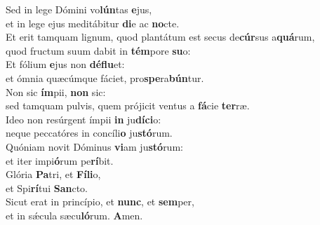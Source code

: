\evenverse Sed in lege Dómini vo\textbf{lún}tas \textbf{e}jus,~\*\\
\evenverse et in lege ejus meditábitur \textbf{di}e ac \textbf{no}cte.\\
\oddverse Et erit tamquam lignum, quod plantátum est secus de\textbf{cúr}sus a\textbf{quá}rum,~\*\\
\oddverse quod fructum suum dabit in \textbf{tém}pore \textbf{su}o:\\
\evenverse Et fólium \textbf{e}jus non \textbf{dé}\textbf{flu}et:~\*\\
\evenverse et ómnia quæcúmque fáciet, pro\textbf{spe}ra\textbf{bún}tur.\\
\oddverse Non sic \textbf{ím}pii, \textbf{non} sic:~\*\\
\oddverse sed tamquam pulvis, quem prójicit ventus a \textbf{fá}cie \textbf{ter}ræ.\\
\evenverse Ideo non resúrgent ímpii \textbf{in} ju\textbf{dí}\textbf{ci}o:~\*\\
\evenverse neque peccatóres in concíli\textbf{o} ju\textbf{stó}rum.\\
\oddverse Quóniam novit Dóminus \textbf{vi}am ju\textbf{stó}rum:~\*\\
\oddverse et iter impi\textbf{ó}rum pe\textbf{rí}bit.\\
\evenverse Glória \textbf{Pa}tri, et \textbf{Fí}\textbf{li}o,~\*\\
\evenverse et Spi\textbf{rí}tui \textbf{San}cto.\\
\oddverse Sicut erat in princípio, et \textbf{nunc}, et \textbf{sem}per,~\*\\
\oddverse et in sǽcula sæcu\textbf{ló}rum. \textbf{A}men.\\
